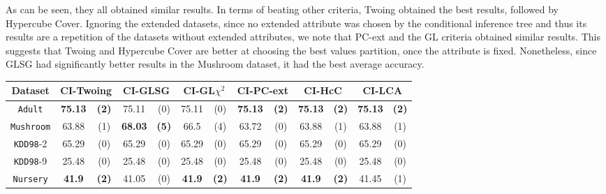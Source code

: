 As can be seen, they all obtained similar results. In terms of beating other criteria, Twoing obtained the best results, followed by Hypercube Cover. Ignoring the extended datasets, since no extended attribute was chosen by the conditional inference tree and thus its results are a repetition of the datasets without extended attributes, we note that PC-ext and the GL criteria obtained similar results. This suggests that Twoing and Hypercube Cover are better at choosing the best values partition, once the attribute is fixed. Nonetheless, since GLSG had significantly better results in the Mushroom dataset, it had the best average accuracy.


\begin{table*}
\scriptsize
\centering
\begin{tabular}{c|cc|cc|cc|cc|cc|cc} 
Dataset  &   \multicolumn{2}{c|}{CI-Twoing} &   \multicolumn{2}{c|}{CI-GLSG} & \multicolumn{2}{c|}{CI-GL$\chi^2$}& \multicolumn{2}{c|}{CI-PC-ext}& \multicolumn{2}{c|}{CI-HcC}& \multicolumn{2}{c}{CI-LCA} \\  \hline   
{\tt Adult}        &{\bf 75.13} & {\bf (2)} & 75.11       & (0)       & 75.11       & (0)       & {\bf 75.13} & {\bf (2)} & {\bf 75.13} & {\bf (2)} & {\bf 75.13} & {\bf (2)} \\
{\tt Mushroom}     &63.88       & (1)       &{\bf 68.03 } & {\bf (5)} & 66.5        & (4)       & 63.72       & (0)       & 63.88       & (1)       & 63.88       & (1)       \\
{\tt KDD98}-2      &65.29       & (0)       & 65.29       & (0)       & 65.29       & (0)       & 65.29       & (0)       & 65.29       & (0)       & 65.29       & (0)       \\
{\tt KDD98}-9      &25.48       & (0)       & 25.48       & (0)       & 25.48       & (0)       & 25.48       & (0)       & 25.48       & (0)       & 25.48       & (0)       \\
{\tt Nursery}      &{\bf 41.9}  & {\bf (2)} & 41.05       & (0)       & {\bf 41.9}  & {\bf (2)} & {\bf 41.9}  & {\bf (2)} & {\bf 41.9}  & {\bf (2)} & 41.45       & (1)       \\

\end{tabular}
\end{table*}
